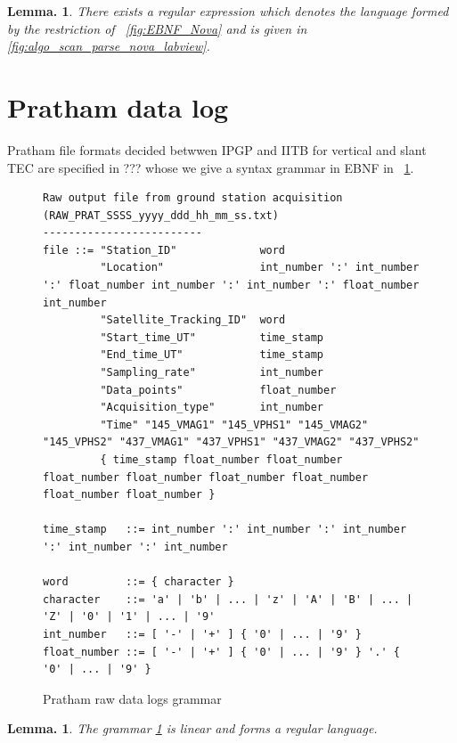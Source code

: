 \documentclass[a4paper]{report}
\newtheorem{lemma}[theorem]{Lemma.}
\newtheorem{proposition}[theorem]{Lemma.}
\begin{document}
\begin{lemma}
  There exists a regular expression which denotes the language formed by the restriction of ~\ref{fig:EBNF_Nova} and is given in \ref{fig:algo_scan_parse_nova_labview}.
\end{lemma}








\section{Pratham data log}
Pratham file formats decided betwwen IPGP and IITB for vertical and slant TEC are specified in ??? whose we give a syntax grammar in EBNF in ~\ref{fig:syntaxe_Pratham_format}.

\begin{figure}[h]
{\scriptsize
\begin{verbatim}
Raw output file from ground station acquisition (RAW_PRAT_SSSS_yyyy_ddd_hh_mm_ss.txt)
-------------------------
file ::= "Station_ID"             word
         "Location"               int_number ':' int_number ':' float_number int_number ':' int_number ':' float_number int_number
         "Satellite_Tracking_ID"  word
         "Start_time_UT"          time_stamp
         "End_time_UT"            time_stamp
         "Sampling_rate"          int_number
         "Data_points"            float_number
         "Acquisition_type"       int_number
         "Time" "145_VMAG1" "145_VPHS1" "145_VMAG2" "145_VPHS2" "437_VMAG1" "437_VPHS1" "437_VMAG2" "437_VPHS2"
         { time_stamp float_number float_number float_number float_number float_number float_number float_number float_number }

time_stamp   ::= int_number ':' int_number ':' int_number ':' int_number ':' int_number

word         ::= { character }
character    ::= 'a' | 'b' | ... | 'z' | 'A' | 'B' | ... | 'Z' | '0' | '1' | ... | '9'
int_number   ::= [ '-' | '+' ] { '0' | ... | '9' }
float_number ::= [ '-' | '+' ] { '0' | ... | '9' } '.' { '0' | ... | '9' }

\end{verbatim}
}
  \caption{Pratham raw data logs grammar}
  \label{fig:syntaxe_Pratham_format}
\end{figure}

\begin{proposition}
  The grammar \ref{fig:syntaxe_Pratham_format} is linear and forms a regular language.
\end{proposition}
\end{document}
